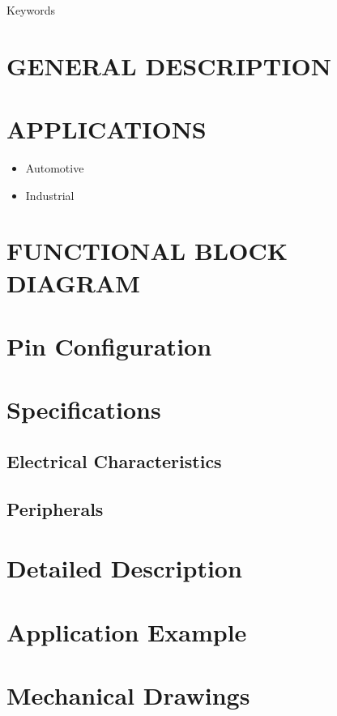 \documentclass{datasheet}
\makeatletter
\renewcommand\tableofcontents{%
	\section*{\makebox[\linewidth][c]{\contentsname}%
		\@mkboth{\MakeUppercase\contentsname}{\MakeUppercase\contentsname}}%
	\begin{multicols}{2}%
		\@starttoc{toc}%
	\end{multicols}
}
\makeatother
\begin{document}
{\hfill Keywords}

\section{GENERAL DESCRIPTION}

\section{APPLICATIONS}
\begin{itemize}
	\item Automotive
	\item Industrial
\end{itemize}

\section{FUNCTIONAL BLOCK DIAGRAM}


\pagebreak
\tableofcontents
\pagebreak

\section{Pin Configuration}

\section{Specifications}
\subsection{Electrical Characteristics}
\subsection{Peripherals}


\section{Detailed Description}

\section{Application Example}

\section{Mechanical Drawings}
\end{document}

